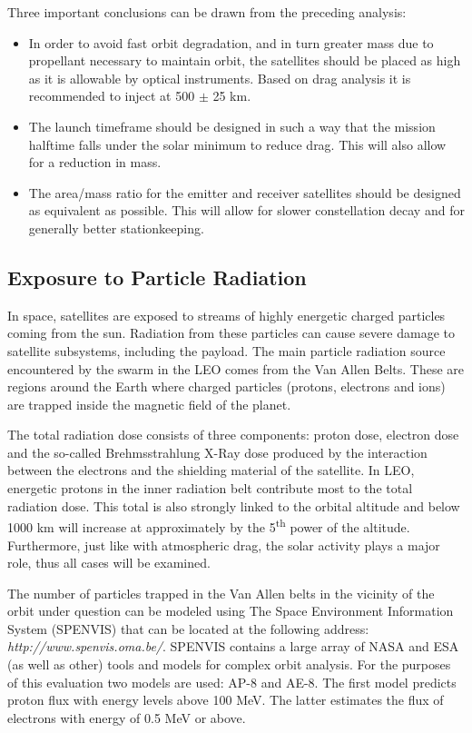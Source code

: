 Three important conclusions can be drawn from the preceding analysis:
\begin{itemize}
	\item In order to avoid fast orbit degradation, and in turn greater mass due to propellant necessary to maintain orbit, the satellites should be placed as high as it is allowable by optical instruments. Based on drag analysis it is recommended to inject at 500 $\pm$ 25 km.
	\item The launch timeframe should be designed in such a way that the mission halftime falls under the solar minimum to reduce drag. This will also allow for a reduction in mass.
	\item The area/mass ratio for the emitter and receiver satellites should be designed as equivalent as possible. This will allow for slower constellation decay and for generally better stationkeeping.  
\end{itemize}
  

\subsection{Exposure to Particle Radiation}
\label{mtrRadiation}

In space, satellites are exposed to streams of highly energetic charged particles coming from the sun. Radiation from these particles can cause severe damage to satellite subsystems, including the payload. The main particle radiation source encountered by the swarm in the \ac{LEO} comes from the Van Allen Belts. These are regions around the Earth where charged particles (protons, electrons and ions) are trapped inside the magnetic field of the planet.

The total radiation dose consists of three components: proton dose, electron dose and the so-called Brehmsstrahlung X-Ray dose produced by the interaction between the electrons and the shielding material of the satellite. In \ac{LEO}, energetic protons in the inner radiation belt contribute most to the total radiation dose. This total is also strongly linked to the orbital altitude and below 1000 km will increase at approximately by the 5\textsuperscript{th} power of the altitude. Furthermore, just like with atmospheric drag, the solar activity plays a major role, thus all cases will be examined.

The number of particles trapped in the Van Allen belts in the vicinity of the orbit under question can be modeled using The Space Environment Information System (SPENVIS) that can be located at the following address: \emph{http://www.spenvis.oma.be/}. SPENVIS contains a large array of NASA and ESA (as well as other) tools and models for complex orbit analysis. For the purposes of this evaluation two models are used: AP-8 and AE-8. The first model predicts proton flux with energy levels above 100 MeV. The latter estimates the flux of electrons with energy of 0.5 MeV or above.


